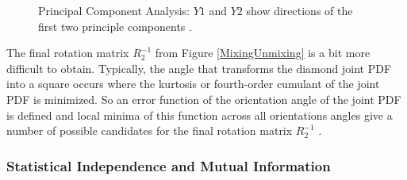 \begin{figure}[thp]
  \begin{center}
    \caption{Principal Component Analysis: $Y1$ and $Y2$ show
      directions of the first two principle components \cite{Cook:97}.}
    \label{PCA}
  \end{center}
\end{figure}

The final rotation matrix $R_{2}^{-1}$ from Figure
\ref{MixingUnmixing} is a bit more difficult to obtain. 
Typically, the angle that transforms the diamond joint PDF into a
square occurs where the kurtosis or fourth-order cumulant of the joint
PDF is minimized. So an error function of the orientation angle of the
joint PDF is defined and local minima of this function across all
orientations angles give a number of possible candidates for
the final rotation matrix $R_{2}^{-1}$ \cite{Farid:99}. 

\vspace{3mm}
\subsubsection{Statistical Independence and Mutual Information}

